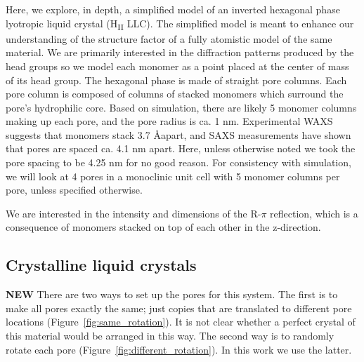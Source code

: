 \documentclass{article}
\begin{document}
  Here, we explore, in depth, a simplified model of an inverted hexagonal phase
  lyotropic liquid crystal (H\textsubscript{II} LLC). The simplified model is
  meant to enhance our understanding of the structure factor of a fully atomistic
  model of the same material. We are primarily interested in the diffraction
  patterns produced by the head groups so we model each monomer as a point placed
  at the center of mass of its head group. The hexagonal phase is made of
  straight pore columns. Each pore column is composed of columns of stacked
  monomers which surround the pore's hydrophilic core. Based on simulation, there
  are likely 5 monomer columns making up each pore, and the pore radius is ca. 1
  nm. Experimental WAXS suggests that monomers stack 3.7 \AA apart, and SAXS
  measurements have shown that pores are spaced ca. 4.1 nm apart. Here, unless
  otherwise noted we took the pore spacing to be 4.25 nm for no good reason. For
  consistency with simulation, we will look at 4 pores in a monoclinic unit cell
  with 5 monomer columns per pore, unless specified otherwise. 

  We are interested in the intensity and dimensions of the R-$\pi$ reflection,
  which is a consequence of monomers stacked on top of each other in the
  z-direction.

  \subsection{Crystalline liquid crystals}

  \textbf{NEW} There are two ways to set up the pores for this system. The
  first is to make all pores exactly the same; just copies that are translated to
  different pore locations (Figure~\ref{fig:same_rotation}). It is not clear
  whether a perfect crystal of this material would be arranged in this way. The
  second way is to randomly rotate each pore
  (Figure~\ref{fig:different_rotation}). In this work we use the latter.  
  
\end{document}
